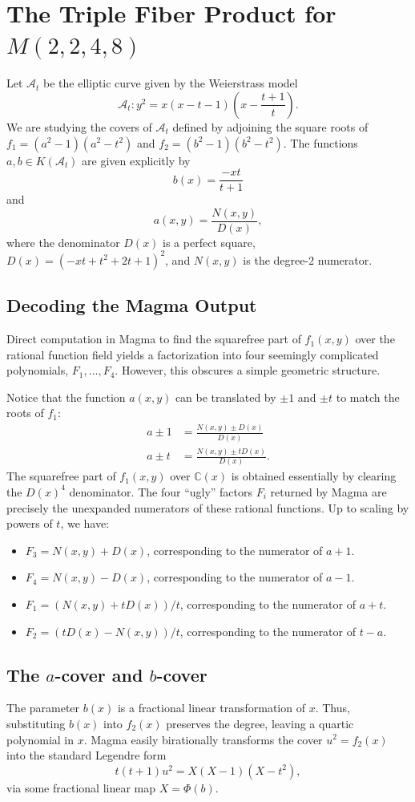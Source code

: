 \documentclass[11pt]{amsart}
\begin{document}
\section*{The Triple Fiber Product for $M(2,2,4,8)$}

Let $\mathcal{A}_t$ be the elliptic curve given by the Weierstrass model 
\[ \mathcal{A}_t \colon y^2 = x(x-t-1)\left(x-\frac{t+1}{t}\right). \]
We are studying the covers of $\mathcal{A}_t$ defined by adjoining the square roots of $f_1 = (a^2-1)(a^2-t^2)$ and $f_2 = (b^2-1)(b^2-t^2)$. The functions $a, b \in K(\mathcal{A}_t)$ are given explicitly by
\[ b(x) = \frac{-xt}{t+1} \]
and
\[ a(x,y) = \frac{N(x,y)}{D(x)}, \]
where the denominator $D(x)$ is a perfect square, $D(x) = (-xt + t^2 + 2t + 1)^2$, and $N(x,y)$ is the degree-2 numerator. 

\subsection*{Decoding the Magma Output}
Direct computation in Magma to find the squarefree part of $f_1(x,y)$ over the rational function field yields a factorization into four seemingly complicated polynomials, $F_1, \dots, F_4$. However, this obscures a simple geometric structure. 

Notice that the function $a(x,y)$ can be translated by $\pm 1$ and $\pm t$ to match the roots of $f_1$:
\begin{align*}
    a \pm 1 &= \frac{N(x,y) \pm D(x)}{D(x)} \\
    a \pm t &= \frac{N(x,y) \pm tD(x)}{D(x)}.
\end{align*}
The squarefree part of $f_1(x,y)$ over $\mathbb{C}(x)$ is obtained essentially by clearing the $D(x)^4$ denominator. The four ``ugly'' factors $F_i$ returned by Magma are precisely the unexpanded numerators of these rational functions. Up to scaling by powers of $t$, we have:
\begin{itemize}
    \item $F_3 = N(x,y) + D(x)$, corresponding to the numerator of $a+1$.
    \item $F_4 = N(x,y) - D(x)$, corresponding to the numerator of $a-1$.
    \item $F_1 = (N(x,y) + tD(x))/t$, corresponding to the numerator of $a+t$.
    \item $F_2 = (tD(x) - N(x,y))/t$, corresponding to the numerator of $t-a$.
\end{itemize}

\subsection*{The $a$-cover and $b$-cover}
The parameter $b(x)$ is a fractional linear transformation of $x$. Thus, substituting $b(x)$ into $f_2(x)$ preserves the degree, leaving a quartic polynomial in $x$. Magma easily birationally transforms the cover $u^2 = f_2(x)$ into the standard Legendre form
\begin{equation} \label{eq:b_cover}
    t(t+1)u^2 = X(X-1)(X-t^2),
\end{equation}
via some fractional linear map $X = \Phi(b)$.
\end{document}
